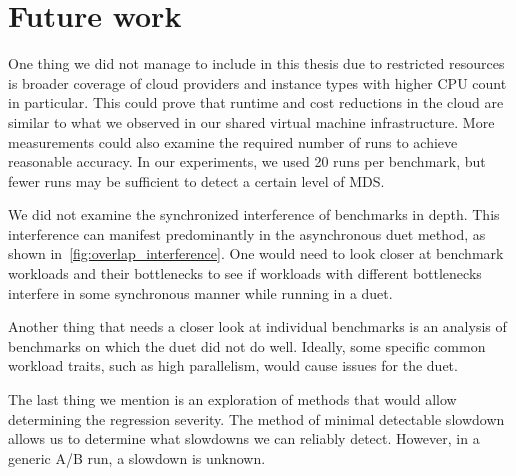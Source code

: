 \section*{Future work}
One thing we did not manage to include in this thesis due to restricted resources is broader coverage of cloud providers and instance types with higher CPU count in particular.
This could prove that runtime and cost reductions in the cloud are similar to what we observed in our shared virtual machine infrastructure.
More measurements could also examine the required number of runs to achieve reasonable accuracy.
In our experiments, we used 20 runs per benchmark, but fewer runs may be sufficient to detect a certain level of MDS.

We did not examine the synchronized interference of benchmarks in depth.
This interference can manifest predominantly in the asynchronous duet method, as shown in~\cref{fig:overlap_interference}.
One would need to look closer at benchmark workloads and their bottlenecks to see if workloads with different bottlenecks interfere in some synchronous manner while running in a duet.

Another thing that needs a closer look at individual benchmarks is an analysis of benchmarks on which the duet did not do well.
Ideally, some specific common workload traits, such as high parallelism, would cause issues for the duet.

The last thing we mention is an exploration of methods that would allow determining the regression severity.
The method of minimal detectable slowdown allows us to determine what slowdowns we can reliably detect.
However, in a generic A/B run, a slowdown is unknown.
